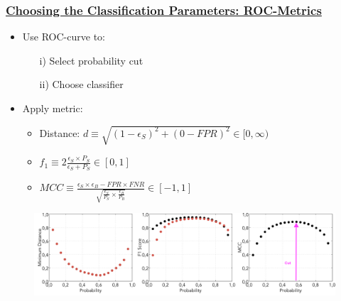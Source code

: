 \documentclass[xcolor=table, xcolor=dvipsnames]{beamer}
\begin{document}
\begin{frame}
  \frametitle{\hyperlink{con}{Choosing the Classification Parameters: ROC-Metrics}}
  \label{rocMetric}
    
     \scriptsize
  \begin{itemize}
   \item Use ROC-curve to:
   \begin{itemize}
     \scriptsize
     \item[i)] Select probability cut
     \item[ii)] Choose classifier
   \end{itemize}
    \item Apply metric:
    \begin{itemize}
      \scriptsize
      \item Distance: $d \equiv \sqrt{(1-\epsilon_S)^2 + (0-FPR)^2} \in [0,\infty)$ {\color{gray}{(left plot)}}
      \item {} $f_1 \equiv 2\frac{\epsilon_S\times P_S}{\epsilon_S + P_S} \in [0,1]$ {\color{gray}{(centre plot)}}
      \item {} $MCC \equiv \frac{\epsilon_S\times \epsilon_B - FPR\times FNR}{\sqrt{ \frac{\epsilon_S}{P_S} \times \frac{\epsilon_B}{P_B} } } \in [-1,1]$ {\color{gray}{(right plot)}}
    \end{itemize}
   \end{itemize}  
    
    \begin{figure}
    \includegraphics[width=1.03\textwidth]{rocMetricMLP_HL85V123456N6000R1.png}
    \end{figure}
  \end{frame}
\end{document}
